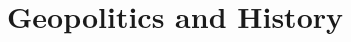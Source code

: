 \documentclass[../my_knowledge.tex]{subfiles}
\begin{document}
\chapter{Geopolitics and History}

\newpage
\minitoc
\newpage



\end{document}
